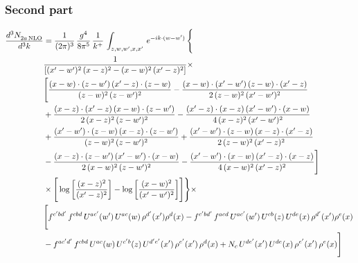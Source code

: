 \documentclass[9pt]{article}
\numberwithin{equation}{section}
\begin{document}
\subsubsection{Second part}
\begin{align}
    \frac{d^{3}N_{2a\,\rm NLO}^{\rm}}{d^{3}k}  & =  \frac{1}{(2\pi)^{3}}\, \frac{g^{4}}{8\pi^{5}}\,\frac{1}{k^{+}}\,\int_{z,w,w^{\prime},x,x'}\, e^{-ik\cdot (w-w')}\, \Bigg\{\notag \\
& \frac{1}{\left[(x'-w')^{2}\, (x-z)^{2}-(x-w)^{2}\, (x'-z)^{2}\right]}\times\,\notag \\ & \Bigg[\frac{(x-w)\cdot (z-w')\, (x'-z)\cdot (z-w)}{(z-w)^{2}\,(z-w')^{2}}-\frac{(x-w)\cdot (x'-w')\, (z-w)\cdot (x'-z)}{2\, (z-w)^{2}\, (x'-w')^{2}}\notag \\ & + \frac{(x-z)\cdot (x'-z)\, (x-w)\cdot (z-w')}{2\, (x-z)^{2}\, (z-w')^{2}}-\frac{(x'-z)\cdot (x-z)\, (x'-w')\cdot (x-w)}{4\, (x-z)^{2}\, (x'-w')^{2}}\notag \\ & + \frac{(x'-w')\cdot (z-w)\, (x-z)\cdot (z-w')}{(z-w)^{2}\,(z-w')^{2}}+\frac{(x'-w')\cdot (z-w)\, (x-z)\cdot (x'-z)}{2\, (z-w)^{2}\, (x'-z)^{2}}\notag \\ & - \frac{(x-z)\cdot (z-w')\, (x'-w')\cdot (x-w)}{2\, (x-w)^{2}\, (z-w')^{2}} -\frac{(x'-w')\cdot (x-w)\, (x'-z)\cdot (x-z)}{4\, (x-w)^{2}\, (x'-z)^{2}}\Bigg]\notag \\ & \times  \Bigg[\log{\left[\frac{(x-z)^{2}}{ (x'-z)^{2}}\right]}-\log{\left[\frac{(x-w)^{2}}{(x'-w')^{2}}\right]}\Bigg]\Bigg\} \times\, \notag \\ & \Bigg[f^{c'bd'}\,f^{cbd}\, U^{ac'}(w')\,U^{ac}(w)\,\rho^{d'}(x')\rho^{d}(x)- f^{c'bd'}\,f^{acd}\,U^{ac'}(w')\,U^{cb}(z)\,U^{de}(x)\,\rho^{d'}(x')\rho^{e}(x) \notag \\ & -f^{ac'd'}\,f^{cbd}\,U^{ac}(w)\,U^{c'b}(z)\,U^{d'e'}(x')\,\rho^{e'}(x')\,\rho^{d}(x) +N_{c}\,U^{de'}(x')\,U^{de}(x)\,\rho^{e'}(x')\,\rho^{e}(x)\Bigg]
\end{align}
\end{document}
